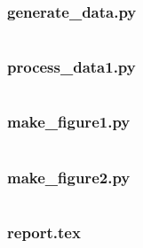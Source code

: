 \documentclass[10pt,letterpaper]{article}
\begin{document}
\subsubsection{generate\_data.py}
\inputminted[linenos,frame=single]{python}{generate_data.py}

\subsubsection{process\_data1.py}
\inputminted[linenos,frame=single]{python}{process_data1.py}

\subsubsection{make\_figure1.py}
\inputminted[linenos,frame=single]{python}{make_figure1.py}

\subsubsection{make\_figure2.py}
\inputminted[linenos,frame=single]{python}{make_figure2.py}

\subsubsection{report.tex}
\inputminted[linenos,frame=single]{latex}{report.tex}
\end{document}
